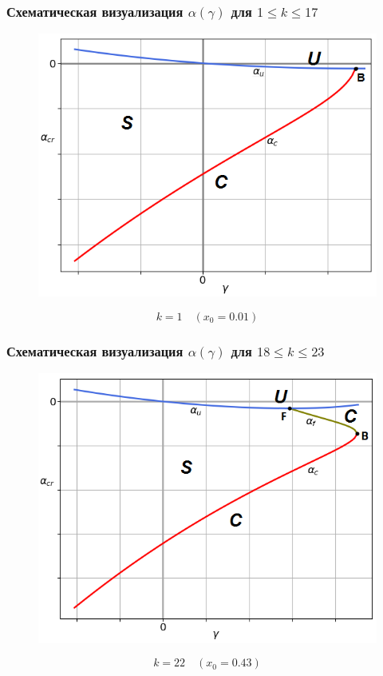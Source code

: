 \documentclass[fullscreen=true, unicode, bookmarks=false]{beamer}
\begin{document}
\begin{frame}
\frametitle{ Схематическая визуализация $ \alpha(\gamma) $ для $ 1 \leqslant k \leqslant 17 $ }

\begin{figure}[h]
\includegraphics[scale=0.55]{k=1.png} 
\end{figure}

$$ k=1 \quad (x_0=0.01) $$

\end{frame}

\begin{frame}
\frametitle{ Схематическая визуализация $ \alpha(\gamma) $ для $ 18 \leqslant k \leqslant 23 $ }

\begin{figure}[h]
\includegraphics[scale=0.55]{k=22.png} 
\end{figure}

$$ k=22 \quad (x_0=0.43) $$

\end{frame}
\end{document}
